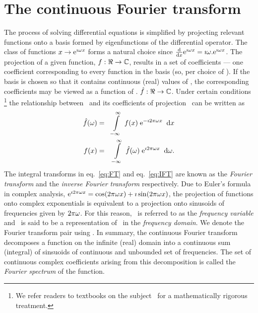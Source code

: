\section{The continuous Fourier transform}

The process of solving differential equations is simplified by projecting relevant functions onto a basis formed by eigenfunctions of the differential operator. The class of functions $x \rightarrow \mathrm{e}^{\mathrm{\imath} \omega x}$ forms a natural choice since $\frac {\mathrm{d}}{\mathrm{d}x} \mathrm{e}^{\mathrm{\imath} \omega x} = \mathrm{\imath} \omega . \mathrm{e}^{\mathrm{\imath} \omega x}$. The projection of a given function, $f: \Re \rightarrow \mathbb{C}$, results in a set of coefficients --- one coefficient corresponding to every function in the basis (so, per choice of \fvn). If the basis is chosen so that it contains continuous (real) values of \fv, the corresponding coefficients may be viewed as a function of \fv. $\hat{f}: \Re\rightarrow\mathbb{C}$. Under certain conditions
\footnote{
We refer readers to textbooks on the subject~\cite{} for a mathematically rigorous treatment.
}
 the relationship between \ifn\ 
and its coefficients of projection \IFn\ can be written as 
\begin{eqnarray}
 \label{eq:FT} \hat{f}(\omega) & = & \displaystyle\int\limits_{-\infty}^{\infty} \; f(x) \; \mathrm{e}^{- \mathrm{\imath} 2\pi \omega x} \;\; \mathrm{d}x  \\
 \label{eq:IFT} f(x) & = & \displaystyle\int\limits_{-\infty}^{\infty} \; \hat{f}(\omega) \; \mathrm{e}^{ \mathrm{\imath} 2\pi \omega x} \;\; \mathrm{d}\omega.
\end{eqnarray}
The integral transforms in eq.~\ref{eq:FT} and eq.~\ref{eq:IFT} are known as the \textit{Fourier transform} and the \textit{inverse Fourier transform} respectively. Due to Euler's formula in complex analysis,  $\mathrm{e}^{\mathrm{\imath} 2\pi \omega x} = \cos({2\pi\omega x}) + \mathrm{\imath} \sin({2\pi\omega x})$, the projection of functions onto complex exponentials is equivalent to a projection onto sinusoids of frequencies given by $2\pi\omega$. For this reason, \fv\ is referred to as the \textit{frequency variable} and \IFn\ is said to be a representation of \ifn\ in the \textit{frequency domain}. We denote the Fourier transform pair using \ifn \Fdual \IFn. In summary, the continuous Fourier transform decomposes a function on the infinite (real) domain into a continuous sum (integral) of sinsuoids of continuous and unbounded set of frequencies. The set of continuous complex coefficients arising from this decomposition is called the \textit{Fourier spectrum} of the function. 

